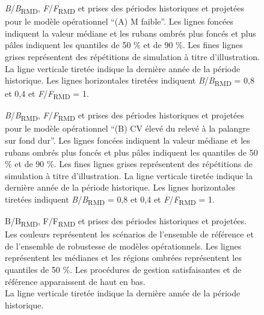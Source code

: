 \documentclass[french,11pt]{book}
\begin{document}
\begin{figure}[htb]

{\centering {} 

}

\caption{\emph{B}/\emph{B}\textsubscript{RMD}, \emph{F}/\emph{F}\textsubscript{RMD} et prises des périodes historiques et projetées pour le modèle opérationnel ``(A) M faible''. Les lignes foncées indiquent la valeur médiane et les rubans ombrés plus foncés et plus pâles indiquent les quantiles de 50 \% et de 90 \%. Les fines lignes grises représentent des répétitions de simulation à titre d'illustration. La ligne verticale tiretée indique la dernière année de la période historique. Les lignes horizontales tiretées indiquent \emph{B}/\emph{B}\textsubscript{RMD} = 0,8 et 0,4 et \emph{F}/\emph{F}\textsubscript{RMD} = 1.}\label{fig:proj-low-m}
\end{figure}

\begin{figure}[htb]

{\centering {} 

}

\caption{\emph{B}/\emph{B}\textsubscript{RMD}, \emph{F}/\emph{F}\textsubscript{RMD} et prises des périodes historiques et projetées pour le modèle opérationnel ``(B) CV élevé du relevé à la palangre sur fond dur''. Les lignes foncées indiquent la valeur médiane et les rubans ombrés plus foncés et plus pâles indiquent les quantiles de 50 \% et de 90 \%. Les fines lignes grises représentent des répétitions de simulation à titre d'illustration. La ligne verticale tiretée indique la dernière année de la période historique. Les lignes horizontales tiretées indiquent \emph{B}/\emph{B}\textsubscript{RMD} = 0,8 et 0,4 et \emph{F}/\emph{F}\textsubscript{RMD} = 1.}\label{fig:proj-high-index-cv}
\end{figure}


\begin{figure}[htb]

{\centering {} 

}

\caption{B/B\textsubscript{RMD}, F/F\textsubscript{RMD} et prises des périodes historiques et projetées. Les couleurs représentent les scénarios de l'ensemble de référence et de l'ensemble de robustesse de modèles opérationnels. Les lignes représentent les médianes et les régions ombrées représentent les quantiles de 50 \%. Les procédures de gestion satisfaisantes et de référence apparaissent de haut en bas.\\
La ligne verticale tiretée indique la dernière année de la période historique.}\label{fig:proj-scenarios}
\end{figure}
\clearpage
\end{document}

